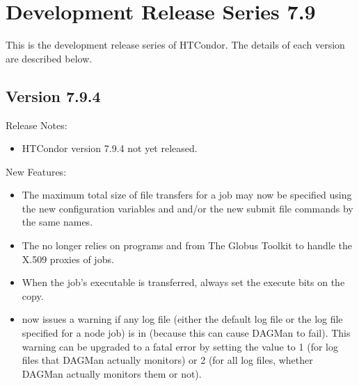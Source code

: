 
\section{\label{sec:History-7-9}Development Release Series 7.9}

This is the development release series of HTCondor.
The details of each version are described below.

\subsection*{\label{sec:New-7-9-4}Version 7.9.4}

\noindent Release Notes:

\begin{itemize}

\item HTCondor version 7.9.4 not yet released.

\end{itemize}


\noindent New Features:

\begin{itemize}

\item The maximum total size of file transfers for a job may now be
specified using the new configuration variables
 and
 and/or the new submit file
commands by the same names.

\item The  no longer relies on programs
 and  from The Globus
Toolkit to handle the X.509 proxies of jobs.

\item When the job's executable is transferred, always set the execute
bits on the copy.

\item {} now issues a warning if any log file (either
the default log file or the log file specified for a node job) is
in  (because this can cause DAGMan to fail).  This warning
can be upgraded to a fatal error by setting the
 value to 1 (for log files that DAGMan
actually monitors) or 2 (for all log files, whether DAGMan actually
monitors them or not).

\end{itemize}


